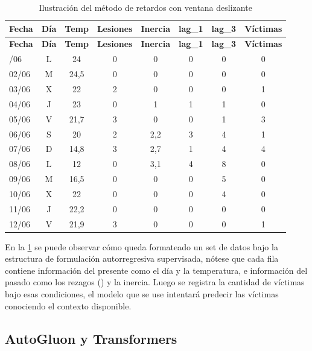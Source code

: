 \begin{longtable}[]{@{}lccccccc@{}}
\caption{Ilustración del método de retardos con ventana deslizante}
\label{tab:ilustracion-sobre-el-metodo-de-retardos-}\\
\toprule\noalign{}
\textbf{Fecha} & \textbf{Día} & \textbf{Temp} & \textbf{Lesiones} & \textbf{Inercia} & \textbf{lag\_1} & \textbf{lag\_3} & \textbf{Víctimas} \\
\midrule\noalign{}
\endfirsthead
\toprule\noalign{}
\textbf{Fecha} & \textbf{Día} & \textbf{Temp} & \textbf{Lesiones} & \textbf{Inercia} & \textbf{lag\_1} & \textbf{lag\_3} & \textbf{Víctimas} \\
\midrule\noalign{}
\endhead
\bottomrule\noalign{}
\endlastfoot
01/06 & L & 24 & 0 & 0 & 0 & 0 & 0 \\
02/06 & M & 24,5 & 0 & 0 & 0 & 0 & 0 \\
03/06 & X & 22 & 2 & 0 & 0 & 0 & 1 \\
04/06 & J & 23 & 0 & 1 & 1 & 1 & 0 \\
05/06 & V & 21,7 & 3 & 0 & 0 & 1 & 3 \\
06/06 & S & 20 & 2 & 2,2 & 3 & 4 & 1 \\
07/06 & D & 14,8 & 3 & 2,7 & 1 & 4 & 4 \\
08/06 & L & 12 & 0 & 3,1 & 4 & 8 & 0 \\
09/06 & M & 16,5 & 0 & 0 & 0 & 5 & 0 \\
10/06 & X & 22 & 0 & 0 & 0 & 4 & 0 \\
11/06 & J & 22,2 & 0 & 0 & 0 & 0 & 0 \\
12/06 & V & 21,9 & 3 & 0 & 0 & 0 & 1 \\
\end{longtable}


En la \cref{tab:ilustracion-sobre-el-metodo-de-retardos-} se puede observar cómo queda formateado un set de datos bajo la estructura de formulación autorregresiva supervisada, nótese que cada fila contiene información del presente como el día y la temperatura, e información del pasado como los rezagos () y la inercia. Luego se registra la cantidad de víctimas bajo esas condiciones, el modelo que se use intentará predecir las víctimas conociendo el contexto disponible.

\subsection{AutoGluon y Transformers}\label{auto-gluon-y-transformers}

